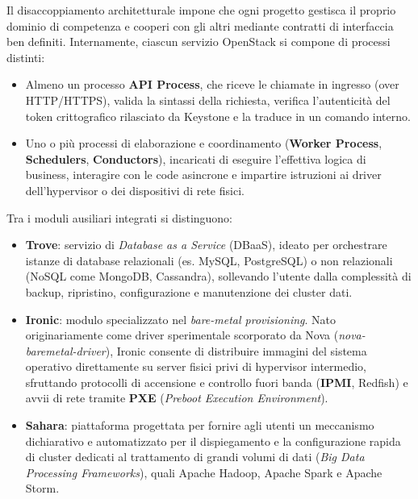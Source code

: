 \documentclass[11pt, a4paper]{article}
\begin{document}
Il disaccoppiamento architetturale impone che ogni progetto gestisca il proprio dominio di competenza e cooperi con gli altri mediante contratti di interfaccia ben definiti. Internamente, ciascun servizio OpenStack si compone di processi distinti:
\begin{itemize}[noitemsep]
    \item Almeno un processo \textbf{API Process}, che riceve le chiamate in ingresso (over HTTP/HTTPS), valida la sintassi della richiesta, verifica l'autenticità del token crittografico rilasciato da Keystone e la traduce in un comando interno.
    \item Uno o più processi di elaborazione e coordinamento (\textbf{Worker Process}, \textbf{Schedulers}, \textbf{Conductors}), incaricati di eseguire l'effettiva logica di business, interagire con le code asincrone e impartire istruzioni ai driver dell'hypervisor o dei dispositivi di rete fisici.
\end{itemize}


Tra i moduli ausiliari integrati si distinguono:
\begin{itemize}
    \item \textbf{Trove}: servizio di \emph{Database as a Service} (DBaaS), ideato per orchestrare istanze di database relazionali (es. MySQL, PostgreSQL) o non relazionali (NoSQL come MongoDB, Cassandra), sollevando l'utente dalla complessità di backup, ripristino, configurazione e manutenzione dei cluster dati.
    \item \textbf{Ironic}: modulo specializzato nel \emph{bare-metal provisioning}. Nato originariamente come driver sperimentale scorporato da Nova (\emph{nova-baremetal-driver}), Ironic consente di distribuire immagini del sistema operativo direttamente su server fisici privi di hypervisor intermedio, sfruttando protocolli di accensione e controllo fuori banda (\textbf{IPMI}, Redfish) e avvii di rete tramite \textbf{PXE} (\emph{Preboot Execution Environment}).
    \item \textbf{Sahara}: piattaforma progettata per fornire agli utenti un meccanismo dichiarativo e automatizzato per il dispiegamento e la configurazione rapida di cluster dedicati al trattamento di grandi volumi di dati (\emph{Big Data Processing Frameworks}), quali Apache Hadoop, Apache Spark e Apache Storm.
\end{itemize}
\end{document}
